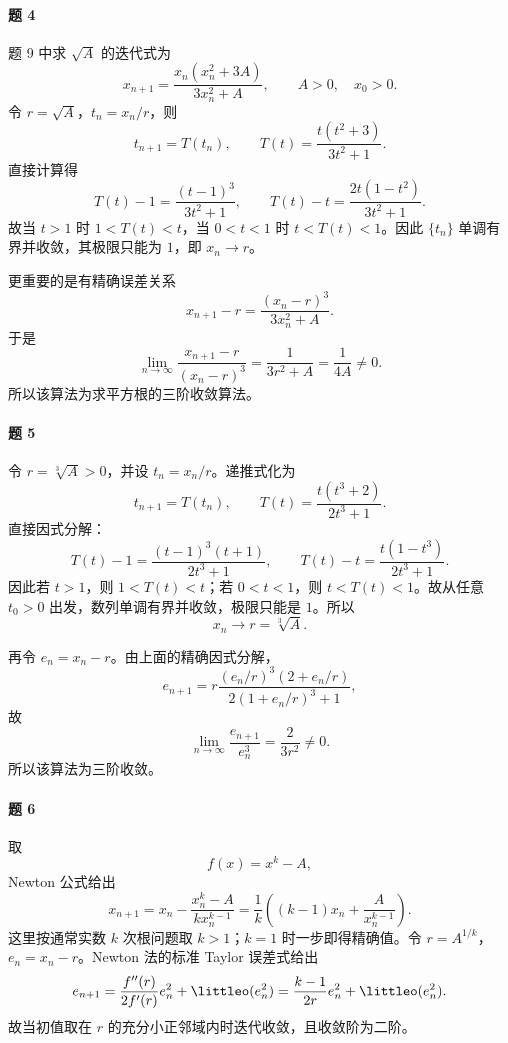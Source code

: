 \paragraph{题 4}
\begin{xsolution}
题 9 中求 $\sqrt A$ 的迭代式为
\[
  x_{n+1}=\frac{x_n(x_n^2+3A)}{3x_n^2+A},
  \qquad A>0,\quad x_0>0.
\]
令 $r=\sqrt A$，$t_n=x_n/r$，则
\[
  t_{n+1}=T(t_n),
  \qquad
  T(t)=\frac{t(t^2+3)}{3t^2+1}.
\]
直接计算得
\[
  T(t)-1=\frac{(t-1)^3}{3t^2+1},
  \qquad
  T(t)-t=\frac{2t(1-t^2)}{3t^2+1}.
\]
故当 $t>1$ 时 $1<T(t)<t$，当 $0<t<1$ 时 $t<T(t)<1$。因此 $\{t_n\}$ 单调有界并收敛，其极限只能为 $1$，即 $x_n\to r$。

更重要的是有精确误差关系
\[
  x_{n+1}-r
  =\frac{(x_n-r)^3}{3x_n^2+A}.
\]
于是
\[
  \lim_{n\to\infty}
  \frac{x_{n+1}-r}{(x_n-r)^3}
  =\frac1{3r^2+A}
  =\frac1{4A}\ne0.
\]
所以该算法为求平方根的三阶收敛算法。
\end{xsolution}

\paragraph{题 5}
\begin{xsolution}
令 $r=\sqrt[3]A>0$，并设 $t_n=x_n/r$。递推式化为
\[
  t_{n+1}=T(t_n),
  \qquad
  T(t)=\frac{t(t^3+2)}{2t^3+1}.
\]
直接因式分解：
\[
  T(t)-1=\frac{(t-1)^3(t+1)}{2t^3+1},
  \qquad
  T(t)-t=\frac{t(1-t^3)}{2t^3+1}.
\]
因此若 $t>1$，则 $1<T(t)<t$；若 $0<t<1$，则 $t<T(t)<1$。故从任意 $t_0>0$ 出发，数列单调有界并收敛，极限只能是 $1$。所以
\[
  \boxed{x_n\to r=\sqrt[3]A}.
\]

再令 $e_n=x_n-r$。由上面的精确因式分解，
\[
  e_{n+1}
  =r\frac{(e_n/r)^3(2+e_n/r)}{2(1+e_n/r)^3+1},
\]
故
\[
  \lim_{n\to\infty}\frac{e_{n+1}}{e_n^3}
  =\frac{2}{3r^2}\ne0.
\]
所以该算法为三阶收敛。
\end{xsolution}

\paragraph{题 6}
\begin{xsolution}
取
\[
  f(x)=x^k-A,
\]
Newton 公式给出
\[
  \boxed{x_{n+1}
  =x_n-\frac{x_n^k-A}{kx_n^{k-1}}
  =\frac1k\left((k-1)x_n+\frac{A}{x_n^{k-1}}\right)}.
\]
这里按通常实数 $k$ 次根问题取 $k>1$；$k=1$ 时一步即得精确值。令 $r=A^{1/k}$，$e_n=x_n-r$。Newton 法的标准 Taylor 误差式给出
\[
  e_{n+1}
  =\frac{f''(r)}{2f'(r)}e_n^2+\littleo(e_n^2)
  =\frac{k-1}{2r}e_n^2+\littleo(e_n^2).
\]
故当初值取在 $r$ 的充分小正邻域内时迭代收敛，且收敛阶为二阶。
\end{xsolution}

